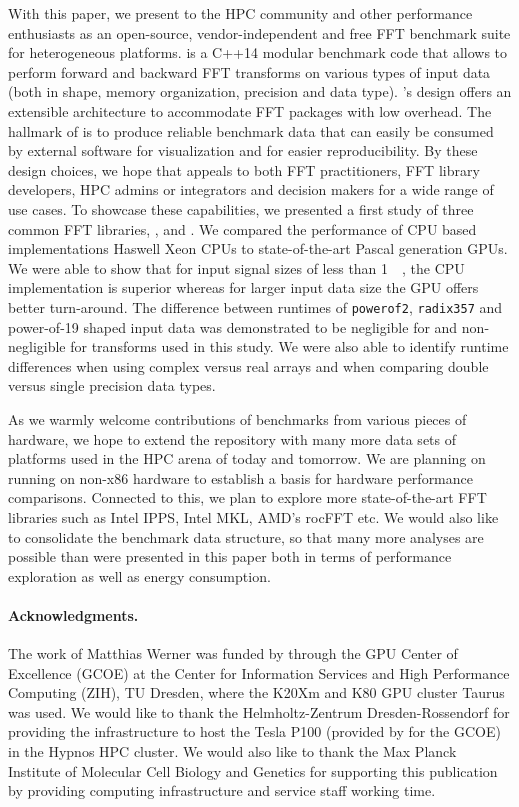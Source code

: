 
With this paper, we present \gearshifft{} to the HPC community and other performance enthusiasts as an open-source, vendor-independent and free FFT benchmark suite for heterogeneous platforms. \gearshifft{} is a C++14 modular benchmark code that allows to perform forward and backward FFT transforms on various types of input data (both in shape, memory organization, precision and data type). \gearshifft{}'s design offers an extensible architecture to accommodate FFT packages with low overhead. The hallmark of \gearshifft{} is to produce reliable benchmark data that can easily be consumed by external software for visualization and for easier reproducibility. By these design choices, we hope that \gearshifft{} appeals to both FFT practitioners, FFT library developers, HPC admins or integrators and decision makers for a wide range of use cases. To showcase these capabilities, we presented a first study of three common FFT libraries, \fftw{}, \clfft{} and \cufft{}. We compared the performance of CPU based implementations Haswell Xeon CPUs to state-of-the-art Pascal generation \nvidia{} GPUs. We were able to show that for input signal sizes of less than \SI{1}{\mebi\byte}, the CPU implementation is superior whereas for larger input data size the GPU offers better turn-around. The difference between runtimes of \texttt{powerof2}, \texttt{radix357} and power-of-19 shaped input data was demonstrated to be negligible for \fftw{} and non-negligible for \cufft{} transforms used in this study. We were also able to identify runtime differences when using complex versus real arrays and when comparing double versus single precision data types.     

As we warmly welcome contributions of benchmarks from various pieces of hardware, we hope to extend the \gearshifft{} repository with many more data sets of platforms used in the HPC arena of today and tomorrow. We are planning on running \gearshifft{} on non-x86 hardware to establish a basis for hardware performance comparisons. Connected to this, we plan to explore more state-of-the-art FFT libraries such as Intel IPPS, Intel MKL, AMD's rocFFT etc. We would also like to consolidate the benchmark data structure, so that many more analyses are possible than were presented in this paper both in terms of performance exploration as well as energy consumption.  

\paragraph{Acknowledgments.} The work of Matthias Werner was funded by \nvidia{} through the GPU Center of Excellence (GCOE) at the Center for Information Services and High Performance Computing (ZIH), TU Dresden, where the K20Xm and K80 GPU cluster Taurus was used. We would like to thank the Helmholtz-Zentrum Dresden-Rossendorf for providing the infrastructure to host the \nvidia{} Tesla P100 (provided by \nvidia{} for the GCOE) in the Hypnos HPC cluster. We would also like to thank the Max Planck Institute of Molecular Cell Biology and Genetics for supporting this publication by providing computing infrastructure and service staff working time.
